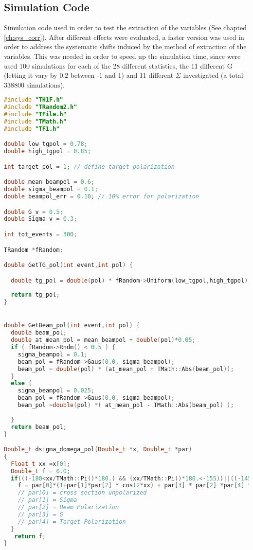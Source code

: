 \FloatBarrier
\subsection{Simulation Code}
\label{app:simcode}
Simulation code used in order to test the extraction of the variables (See chapted \ref{ch:sys_corr}). After different effects were evaluated, a faster version was used in order to address the systematic shifts induced by the method of extraction of the variables. This was needed in order to speed up the simulation time, since were used 100 simulations for each of the 28 different statistics, the 11 different G (letting it vary by 0.2 between -1 and 1) and 11 different $\Sigma$ investigated (a total 338800 simulations).
\begin{lstlisting}[language=C++]
#include "TH1F.h"
#include "TRandom2.h"
#include "TFile.h"
#include "TMath.h"
#include "TF1.h"

double low_tgpol = 0.78;
double high_tgpol = 0.85;

int target_pol = 1; // define target polarization

double mean_beampol = 0.6;
double sigma_beampol = 0.1;
double beampol_err = 0.10; // 10% error for polarization

double G_v = 0.5;
double Sigma_v = 0.3;

int tot_events = 300;

TRandom *fRandom;

double GetTG_pol(int event,int pol) {

  double tg_pol = double(pol) * fRandom->Uniform(low_tgpol,high_tgpol);
  
  return tg_pol;
}


double GetBeam_pol(int event,int pol) {
  double beam_pol;
  double at_mean_pol = mean_beampol + double(pol)*0.05;
  if ( fRandom->Rndm() < 0.5 ) {
    sigma_beampol = 0.1;
    beam_pol = fRandom->Gaus(0.0, sigma_beampol);
    beam_pol = double(pol) * (at_mean_pol + TMath::Abs(beam_pol));
  }
  else {
    sigma_beampol = 0.025;
    beam_pol = fRandom->Gaus(0.0, sigma_beampol);
    beam_pol =double(pol) *( at_mean_pol - TMath::Abs(beam_pol) );
 
  }
  return beam_pol;
}

Double_t dsigma_domega_pol(Double_t *x, Double_t *par)
{
  Float_t xx =x[0];
  Double_t f = 0.0;
  if(((-180<xx/TMath::Pi()*180.) && (xx/TMath::Pi()*180.<-155))||((-145<xx/TMath::Pi()*180.)&&(xx/TMath::Pi()*180.<-95))||((-85<xx/TMath::Pi()*180.)&&(xx/TMath::Pi()*180.<-35))||((-25<xx/TMath::Pi()*180.)&&(xx/TMath::Pi()*180.<25))||((35<xx/TMath::Pi()*180.)&&(xx/TMath::Pi()*180.<85))||((95<xx/TMath::Pi()*180.)&&(xx/TMath::Pi()*180.<145))||((155<xx/TMath::Pi()*180.)&&(xx/TMath::Pi()*180.<180))){
    f = par[0]*(1+par[1]*par[2] * cos(2*xx) + par[3] * par[2] *par[4] * sin(2*xx));  
    // par[0] = cross section unpolarized
    // par[1] = Sigma
    // par[2] = Beam Polarization
    // par[3] = G
    // par[4] = Target Polarization
  }
   return f;
}



\end{lstlisting}
